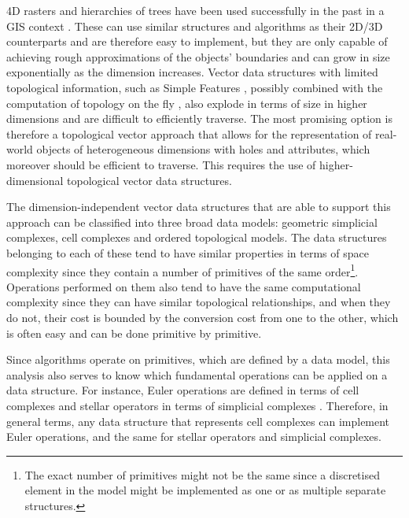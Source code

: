 4D rasters and hierarchies of trees have been used successfully in the past in a GIS context \citep{Mason94,Varma90,Bernard98,Oconaill92}.
These can use similar structures and algorithms as their 2D/3D counterparts and are therefore easy to implement, but they are only capable of achieving rough approximations of the objects' boundaries \citep{Blaschke10} and can grow in size exponentially as the dimension increases.
Vector data structures with limited topological information, such as Simple Features \citep{SimpleFeatures1}, possibly combined with the computation of topology on the fly \citep{ESRITopology}, also explode in terms of size in higher dimensions and are difficult to efficiently traverse.
The most promising option is therefore a topological vector approach that allows for the representation of real-world objects of heterogeneous dimensions with holes and attributes, which moreover should be efficient to traverse.
This requires the use of higher-dimensional topological vector data structures.

The dimension-independent vector data structures that are able to support this approach can be classified into three broad data models: geometric simplicial complexes, cell complexes and ordered topological models.
The data structures belonging to each of these tend to have similar properties in terms of space complexity since they contain a number of primitives of the same order\footnote{The exact number of primitives might not be the same since a discretised element in the model might be implemented as one or as multiple separate structures.}.
Operations performed on them also tend to have the same computational complexity since they can have similar topological relationships, and when they do not, their cost is bounded by the conversion cost from one to the other, which is often easy and can be done primitive by primitive.

Since algorithms operate on primitives, which are defined by a data model, this analysis also serves to know which fundamental operations can be applied on a data structure.
For instance, Euler operations are defined in terms of cell complexes \citep{Mantyla88} and stellar operators in terms of simplicial complexes \citep{Velho03}.
Therefore, in general terms, any data structure that represents cell complexes can implement Euler operations, and the same for stellar operators and simplicial complexes.


